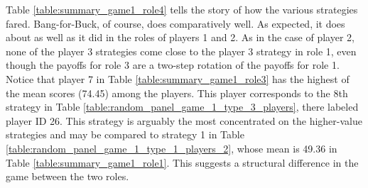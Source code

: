 \documentclass[11pt, oneside]{article}   	%
\begin{document}
\newpage\clearpage

Table \ref{table:summary_game1_role4} tells the story of how the various strategies fared. Bang-for-Buck, of course, does comparatively well. As expected, it does about as well as it did in the roles of players 1 and 2. As in the case of player 2, none of the player 3 strategies come close to the player 3 strategy in role 1, even though the payoffs for role 3 are a two-step rotation of the  payoffs for role 1. Notice that player 7 in Table \ref{table:summary_game1_role3}  has the highest of the mean scores (74.45) among the players. This player corresponds to the 8th strategy in Table \ref{table:random_panel_game_1_type_3_players}, there labeled player ID 26. This strategy is arguably the most concentrated on the higher-value strategies and may be compared to 
strategy 1 in Table \ref{table:random_panel_game_1_type_1_players_2},  whose mean is 49.36 in Table \ref{table:summary_game1_role1}. This suggests a structural difference in the game between the two roles.
\end{document}
